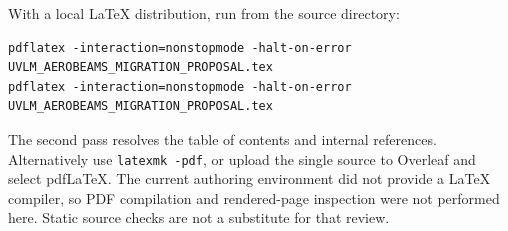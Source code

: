 \documentclass[11pt,a4paper]{article}
\newcommand{\code}{\nolinkurl}
\begin{document}
With a local LaTeX distribution, run from the source directory:
\begin{lstlisting}
pdflatex -interaction=nonstopmode -halt-on-error UVLM_AEROBEAMS_MIGRATION_PROPOSAL.tex
pdflatex -interaction=nonstopmode -halt-on-error UVLM_AEROBEAMS_MIGRATION_PROPOSAL.tex
\end{lstlisting}
The second pass resolves the table of contents and internal references.
Alternatively use \code{latexmk -pdf}, or upload the single source to Overleaf
and select pdfLaTeX. The current authoring environment did not provide a
LaTeX compiler, so PDF compilation and rendered-page inspection were not
performed here. Static source checks are not a substitute for that review.
\end{document}
